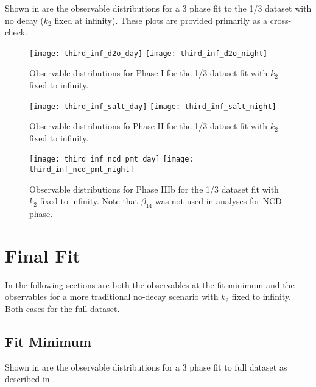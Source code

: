 Shown in  are the observable distributions for a 3 phase fit to the 1/3 dataset with no decay ($k_2$ fixed at infinity). These plots are provided primarily as a cross-check.

\begin{figure}
\centering
\texttt{[image: third\_inf\_d2o\_day]}
\texttt{[image: third\_inf\_d2o\_night]}
\caption{\label{fig:third_inf_d2o_obs}Observable distributions for Phase I for the 1/3 dataset fit with $k_2$ fixed to infinity.}
\end{figure}
\begin{figure}
\centering
\texttt{[image: third\_inf\_salt\_day]}
\texttt{[image: third\_inf\_salt\_night]}
\caption{\label{fig:third_inf_salt_obs}Observable distributions fo Phase II for the 1/3 dataset fit with $k_2$ fixed to infinity.}
\end{figure}
\begin{figure}
\centering
\texttt{[image: third\_inf\_ncd\_pmt\_day]}
\texttt{[image: third\_inf\_ncd\_pmt\_night]}
\caption{\label{fig:third_inf_ncd_pmt_obs}Observable distributions for Phase IIIb for the 1/3 dataset fit with $k_2$ fixed to infinity. Note that $\beta_{14}$ was not used in analyses for NCD phase.}
\end{figure}

\clearpage

\section{Final Fit}

\label{final_observables}

In the following sections are both the observables at the fit minimum and the observables for a more traditional no-decay scenario with $k_2$ fixed to infinity. Both cases for the full dataset.

\subsection{Fit Minimum}

Shown in  are the observable distributions for a 3 phase fit to full dataset as described in .

